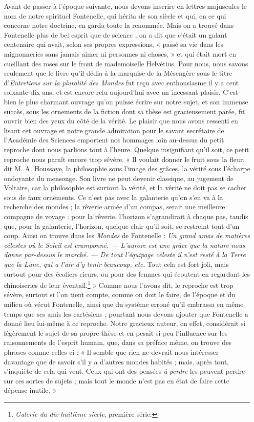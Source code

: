 \documentclass[a4paper, 11pt, oneside, landscape]{article}
\begin{document}
Avant de passer à l'époque suivante, nous devons inscrire en lettres majuscules le nom de notre spirituel Fontenelle, qui hérita de son siècle et qui, en ce qui concerne notre doctrine, en garda toute la renommée. Mais on a trouvé dans Fontenelle plus de bel esprit que de science ; on a dit que c'était un galant centenaire qui avait, selon ses propres expressions, « passé sa vie dans les mignonneries sans jamais aimer ni personnes ni choses, » et qui était mort en cueillant des roses sur le front de mademoiselle Helvétius. Pour nous, nous savons seulement que le livre qu'il dédia à la marquise de la Mésengère sous le titre d'\emph{Entretiens sur la pluralité des Mondes} fut reçu avec enthousiasme il y a cent soixante-dix ans, et est encore relu aujourd'hui avec un incessant plaisir. C'est-bien le plus charmant ouvrage qu'on puisse écrire sur notre sujet, et son immense succès, sous les ornements de la fiction dont sa thèse est gracieusement parée, fit ouvrir bien des yeux du côté de la vérité. Le plaisir que nous avons ressenti en lisant cet ouvrage et notre grande admiration pour le savant secrétaire de l'Académie des Sciences emportent nos hommages loin au-dessus du petit reproche dont nous parlions tout à l'heure. Quelque insignifiant qu'il soit, ce petit reproche nous paraît encore trop sévère. « Il voulait donner le fruit sous la fleur, dit M. A. Houssaye, la philosophie sous l'image des grâces, la vérité sous l'écharpe ondoyante du mensonge. Son livre ne peut devenir classique, au jugement de Voltaire, car la philosophie est surtout la vérité, et la vérité ne doit pas se cacher sous de faux ornements. Ce n'est pas avec la galanterie qu'on s'en va à la recherche des mondes ; la rêverie armée d'un compas, serait une meilleure compagne de voyage : pour la rêverie, l'horizon s'agrandirait à chaque pas, tandis que, pour la galanterie, l'horizon, quelque clair qu'il soit, se restreint tout d'un coup. Ainsi on trouve dans les \emph{Mondes} de Fontenelle : \emph{Un grand amas de matières célestes où le Soleil est cramponné. --- L'aurore est une grâce que la nature nous donne par-dessus le marché. --- De tout l'équipage céleste il n'est resté à la Terre que la Lune, qui a l'air d'y tenir beaucoup, etc.} Tout cela est fort joli, mais surtout pour des écoliers rieurs, ou pour des femmes qui écoutent en regardant les chinoiseries de leur éventail.\footnote{\emph{Galerie du dix-huitième siècle}, première série.} » Comme nous l'avons dit, le reproche est trop sévère, surtout si l'on tient compte, comme on doit le faire, de l'époque et du milieu où vécut Fontenelle, ainsi que du système erroné qu'il embrassa en même temps que ses amis les cartésiens ; pourtant nous devons ajouter que Fontenelle a donné lieu lui-même à ce reproche. Notre gracieux auteur, en effet, considérait si légèrement le sujet de sa propre thèse et en pesait si peu l'influence sur les raisonnements de l'esprit humain, que, dans sa préface même, on trouve des phrases comme celles-ci : « Il semble que rien ne devrait nous intéresser davantage que de savoir s'il y a d'autres mondes habités ; mais, après tout, s'inquiète de cela qui veut. Ceux qui ont des pensées \emph{à perdre} les peuvent perdre sur ces sortes de sujets ; mais tout le monde n'est pas en état de faire cette dépense inutile. »
\end{document}
